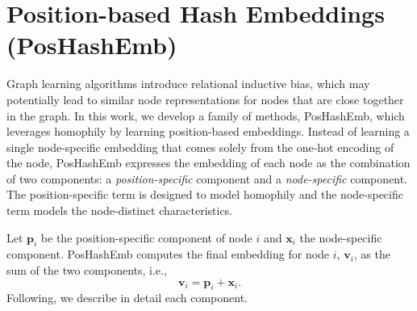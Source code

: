\documentclass[conference]{IEEEtran}
\begin{document}
\section{Position-based Hash Embeddings (PosHashEmb)}
\label{PosEmb}
% 
Graph learning algorithms introduce relational inductive bias, which may potentially lead to similar node representations for nodes that are close together in the graph. In this work, we develop a family of methods, PosHashEmb, which 
leverages homophily by learning position-based embeddings. 
% 
Instead of learning a single node-specific embedding that comes solely from the one-hot encoding of the node,
PosHashEmb expresses the embedding of each node as the combination of two components: a \textit{position-specific} component and a \textit{node-specific} component. The position-specific term is designed to model homophily and the node-specific term models the node-distinct characteristics. 
% 

Let $\mathbf{p}_i$ be the position-specific component of node $i$ and $\mathbf{x}_i$ the node-specific component.
PosHashEmb computes the final embedding for node $i$, $\mathbf{v}_i$, as the sum of the two components, i.e.,
\begin{equation}
\label{final_emb}
    \mathbf{v}_i = \mathbf{p}_i + \mathbf{x}_i.
\end{equation}
% 
% 
Following, we describe in detail each component.
\end{document}
